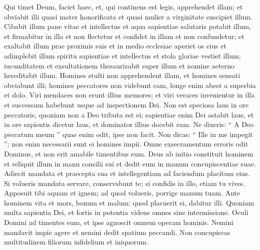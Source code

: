 \begin{biblechapter}
\begin{biblechapter}
\begin{biblechapter}
\begin{biblechapter}
\begin{biblechapter}
\begin{biblechapter}
\begin{biblechapter}
\begin{biblechapter}
\begin{biblechapter}
\begin{biblechapter}
\begin{biblechapter}
\begin{biblechapter}
\begin{biblechapter}
\begin{biblechapter}
\begin{biblechapter}
\verse Qui timet Deum, faciet haec,
 et, qui continens est legis, apprehendet illam;
 \verse et obviabit illi quasi mater honorificata
 et quasi mulier a virginitate suscipiet illum.
 \verse Cibabit illum pane vitae et intellectus
 et aqua sapientiae salutaris potabit illum,
 et firmabitur in illa et non flectetur
 \verse et confidet in illam et non confundetur;
 et exaltabit illum prae proximis suis
 \verse et in medio ecclesiae aperiet os eius
 et adimplebit illum spiritu sapientiae et intellectus
 et stola gloriae vestiet illum;
 \verse iucunditatem et exsultationem thesaurizabit super illum
 et nomine aeterno hereditabit illum.
 \verse Homines stulti non apprehendent illam,
 et homines sensati obviabunt illi;
 homines peccatores non videbunt eam,
 longe enim abest a superbia et dolo.
 \verse Viri mendaces non erunt illius memores;
 et viri veraces invenientur in illa
 et successum habebunt usque ad inspectionem Dei.
 \verse Non est speciosa laus in ore peccatoris,
 \verse quoniam non a Deo tributa est ei;
 sapientiae enim Dei astabit laus,
 et in ore sapientis dicetur laus,
 et dominator illius docebit eam.
 \verse Ne dixeris: “ A Deo peccatum meum ”
 quae enim odit, ipse non facit.
 \verse Non dicas: “ Ille in me impegit ”;
 non enim necessarii sunt ei homines impii.
 \verse Omne exsecramentum erroris odit Dominus,
 et non erit amabile timentibus eum.
 \verse Deus ab initio constituit hominem
 et reliquit illum in manu consilii sui
 et dedit eum in manum concupiscentiae suae.
 \verse Adiecit mandata et praecepta sua
 et intellegentiam ad faciendum placitum eius.
 \verse Si volueris mandata servare, conservabunt te;
 si confidis in illo, etiam tu vives.
 \verse Apposuit tibi aquam et ignem;
 ad quod volueris, porrige manum tuam.
 \verse Ante hominem vita et mors, bonum et malum:
 quod placuerit ei, dabitur illi.
 \verse Quoniam multa sapientia Dei,
 et fortis in potentia videns omnes sine intermissione.
 \verse Oculi Domini ad timentes eum,
 et ipse agnoscit omnem operam hominis.
 \verse Nemini mandavit impie agere
 et nemini dedit spatium peccandi.
 \verse Non concupiscas multitudinem filiorum infidelium et iniquorum.
 

\end{biblechapter}
\end{biblechapter}
\end{biblechapter}
\end{biblechapter}
\end{biblechapter}
\end{biblechapter}
\end{biblechapter}
\end{biblechapter}
\end{biblechapter}
\end{biblechapter}
\end{biblechapter}
\end{biblechapter}
\end{biblechapter}
\end{biblechapter}
\end{biblechapter}
